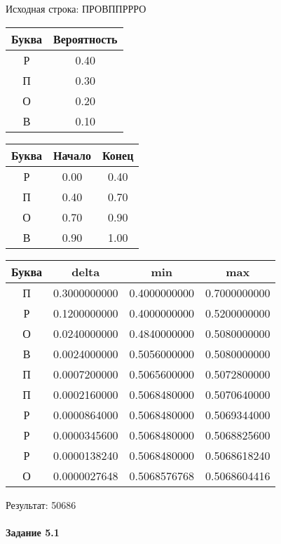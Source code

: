 \documentclass[a4paper, 12pt]{article}
\begin{document}
Исходная строка: ПРОВППРРРО\
\begin{center}
 \begin{tabular}{ |c|c| } 
  \hline
     Буква & Вероятность \\ \hline
Р & 0.40\\\hline
П & 0.30\\\hline
О & 0.20\\\hline
В & 0.10
\\ \hline \end{tabular}
\end{center}
\begin{center}
 \begin{tabular}{ |c|c|c| } 
  \hline
     Буква & Начало & Конец \\ \hline
Р & 0.00 & 0.40\\\hline
П & 0.40 & 0.70\\\hline
О & 0.70 & 0.90\\\hline
В & 0.90 & 1.00
\\ \hline \end{tabular}
\end{center}
\begin{center}
 \begin{tabular}{ |c|c|c|c| } 
  \hline
     Буква & delta & min & max \\ \hline
П & 0.3000000000 & 0.4000000000 & 0.7000000000\\\hline
Р & 0.1200000000 & 0.4000000000 & 0.5200000000\\\hline
О & 0.0240000000 & 0.4840000000 & 0.5080000000\\\hline
В & 0.0024000000 & 0.5056000000 & 0.5080000000\\\hline
П & 0.0007200000 & 0.5065600000 & 0.5072800000\\\hline
П & 0.0002160000 & 0.5068480000 & 0.5070640000\\\hline
Р & 0.0000864000 & 0.5068480000 & 0.5069344000\\\hline
Р & 0.0000345600 & 0.5068480000 & 0.5068825600\\\hline
Р & 0.0000138240 & 0.5068480000 & 0.5068618240\\\hline
О & 0.0000027648 & 0.5068576768 & 0.5068604416
\\ \hline \end{tabular}
\end{center}
Результат: 50686
\pagebreak
\paragraph{Задание 5.1}
\end{document}
